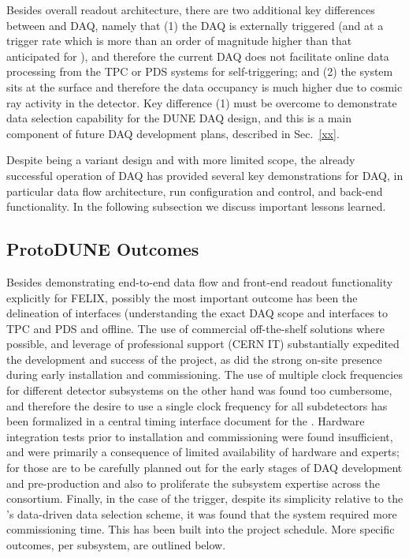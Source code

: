 Besides overall readout architecture, there are two additional key differences between  and
 DAQ, namely that (1) the  DAQ is externally
triggered (and at a trigger rate which is more than an order of
magnitude higher than that anticipated for ),
and therefore the current  DAQ does not facilitate online data
processing from the TPC or PDS systems for self-triggering; and (2) the
system sits at the surface and therefore the data occupancy is much higher
due to cosmic ray activity in the detector. Key difference (1) must be
overcome to demonstrate data selection capability for the DUNE DAQ
design, and this is a main component of future DAQ development plans, described
in Sec.~\ref{xx}.

Despite being a variant design and with more limited scope, the already
successful operation of  DAQ has provided several key
demonstrations for  DAQ, in particular data flow
architecture, run configuration and control, and back-end
functionality. In the following subsection we discuss important lessons learned.

\subsection{ProtoDUNE Outcomes}
Besides demonstrating end-to-end data flow and front-end readout functionality
explicitly for FELIX, possibly the most important outcome has been the delineation of
interfaces (understanding the exact DAQ scope and interfaces to TPC
and PDS and offline. The use of commercial off-the-shelf solutions
where possible, and leverage of professional support (CERN IT)
substantially expedited the development and success of the project, as
did the strong on-site presence during early installation and
commissioning. The use of multiple clock frequencies for different
detector subsystems on the other hand was found too cumbersome, and therefore the desire
to use a single clock frequency for all  subdetectors has been
formalized in a central timing interface document for the 
 \citedocdb{}. Hardware integration tests prior to
installation and commissioning were found insufficient, and were
primarily a consequence of limited
availability of hardware and experts; for  those are
to be carefully planned out for the early stages of DAQ development and
pre-production and also to proliferate the subsystem expertise across
the consortium. Finally, in the case of the  trigger, despite its simplicity
relative to the 's data-driven data selection scheme, it
was found that the system required more commissioning time. This has
been built into the  project schedule. More specific
outcomes, per  subsystem, are outlined below.


